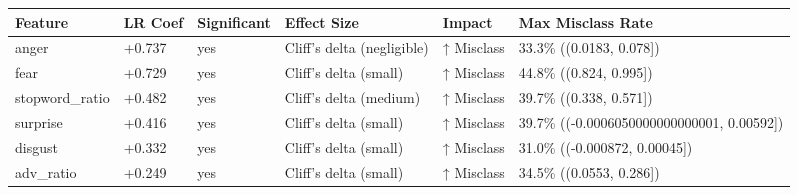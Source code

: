 \begin{tabular}{llllll}
\toprule
Feature & LR Coef & Significant & Effect Size & Impact & Max Misclass Rate \\
\midrule
anger & +0.737 & yes & Cliff's delta (negligible) & ↑ Misclass & 33.3\% ((0.0183, 0.078]) \\
fear & +0.729 & yes & Cliff's delta (small) & ↑ Misclass & 44.8\% ((0.824, 0.995]) \\
stopword\_ratio & +0.482 & yes & Cliff's delta (medium) & ↑ Misclass & 39.7\% ((0.338, 0.571]) \\
surprise & +0.416 & yes & Cliff's delta (small) & ↑ Misclass & 39.7\% ((-0.0006050000000000001, 0.00592]) \\
disgust & +0.332 & yes & Cliff's delta (small) & ↑ Misclass & 31.0\% ((-0.000872, 0.00045]) \\
adv\_ratio & +0.249 & yes & Cliff's delta (small) & ↑ Misclass & 34.5\% ((0.0553, 0.286]) \\
\bottomrule
\end{tabular}
